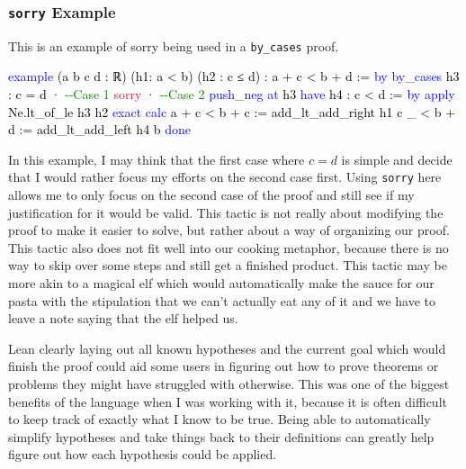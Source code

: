 \documentclass[
  letterpaper,
]{scrreprt}
\newenvironment{Shaded}{\begin{snugshade}}{\end{snugshade}}
\newcommand{\CommentTok}[1]{\textcolor[rgb]{0.37,0.37,0.37}{#1}}
\newcommand{\ConstantTok}[1]{\textcolor[rgb]{0.56,0.35,0.01}{#1}}
\newcommand{\KeywordTok}[1]{\textcolor[rgb]{0.00,0.23,0.31}{#1}}
\newcommand{\NormalTok}[1]{\textcolor[rgb]{0.00,0.23,0.31}{#1}}
\renewcommand{\NormalTok}[1]{\textcolor[HTML]{000000}{#1}}
\renewcommand{\KeywordTok}[1]{\textcolor[HTML]{0000FF}{#1}}
\renewcommand{\CommentTok}[1]{\textcolor[HTML]{008000}{#1}}
\renewcommand{\ConstantTok}[1]{\textcolor[HTML]{DC143C}{#1}}
\theoremstyle{remark}
\begin{document}
\hypertarget{sorry-example}{%
\subsubsection{\texorpdfstring{\texttt{sorry}
Example}{sorry Example}}\label{sorry-example}}

This is an example of sorry being used in a \texttt{by\_cases} proof.

\begin{Shaded}
\begin{Highlighting}[]
\KeywordTok{example}\NormalTok{ (a b c d : ℝ) (h1: a \textless{} b) }
\NormalTok{    (h2 : c ≤ d) : a + c \textless{} b + d := }\KeywordTok{by}
  \KeywordTok{by\_cases}\NormalTok{ h3 : c = d}
\NormalTok{  · }\CommentTok{{-}{-}Case 1 }
    \ConstantTok{sorry}
\NormalTok{  · }\CommentTok{{-}{-}Case 2}
    \KeywordTok{push\_neg} \KeywordTok{at}\NormalTok{ h3}
    \KeywordTok{have}\NormalTok{ h4 : c \textless{} d := }\KeywordTok{by}
      \KeywordTok{apply}\NormalTok{ Ne.lt\_of\_le h3 h2}
    \KeywordTok{exact} \KeywordTok{calc}
\NormalTok{      a + c \textless{} b + c := add\_lt\_add\_right h1 c}
\NormalTok{      \_ \textless{} b + d := add\_lt\_add\_left h4 b}
  \KeywordTok{done}
\end{Highlighting}
\end{Shaded}

In this example, I may think that the first case where \(c = d\) is
simple and decide that I would rather focus my efforts on the second
case first. Using \texttt{sorry} here allows me to only focus on the
second case of the proof and still see if my justification for it would
be valid. This tactic is not really about modifying the proof to make it
easier to solve, but rather about a way of organizing our proof. This
tactic also does not fit well into our cooking metaphor, because there
is no way to skip over some steps and still get a finished product. This
tactic may be more akin to a magical elf which would automatically make
the sauce for our pasta with the stipulation that we can't actually eat
any of it and we have to leave a note saying that the elf helped us.

Lean clearly laying out all known hypotheses and the current goal which
would finish the proof could aid some users in figuring out how to prove
theorems or problems they might have struggled with otherwise. This was
one of the biggest benefits of the language when I was working with it,
because it is often difficult to keep track of exactly what I know to be
true. Being able to automatically simplify hypotheses and take things
back to their definitions can greatly help figure out how each
hypothesis could be applied.
\end{document}
